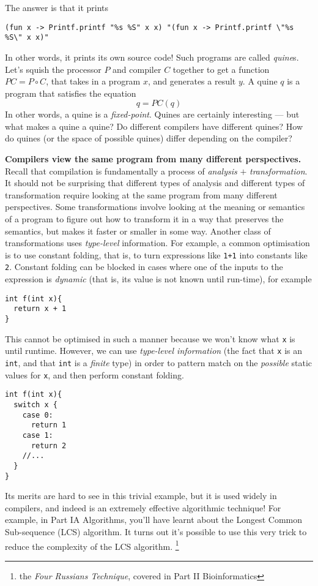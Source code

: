 The answer is that it prints 

{
\verb|(fun x -> Printf.printf "%s %S" x x) "(fun x -> Printf.printf \"%s %S\" x x)"|
}

In other words, it prints its own source code! Such programs are called \emph{quine}s. Let's squish the processor $P$ and compiler $C$ together to get a function $PC = P \circ C$, that takes in a program $x$, and generates a result $y$. A quine $q$ is a program that satisfies the equation
\[q = PC(q)\]
In other words, a quine is a \emph{fixed-point}. Quines are certainly interesting --- but what makes a quine a quine? Do different compilers have different quines? How do quines (or the space of possible quines) differ depending on the compiler?

\textbf{Compilers view the same program from many different perspectives.} Recall that compilation is fundamentally a process of \textit{analysis} $+$ \textit{transformation}. It should not be surprising that different types of analysis and different types of transformation require looking at the same program from many different perspectives. Some transformations involve looking at the meaning or semantics of a program to figure out how to transform it in a way that preserves the semantics, but makes it faster or smaller in some way. Another class of transformations uses \emph{type-level} information. For example, a common optimisation is to use constant folding, that is, to turn expressions like \texttt{1+1} into constants like \texttt{2}. Constant folding can be blocked in cases where one of the inputs to the expression is \emph{dynamic} (that is, its value is not known until run-time), for example

\begin{verbatim}
int f(int x){
  return x + 1
}
\end{verbatim}
This cannot be optimised in such a manner because we won't know what \texttt{x} is until runtime. However, we can use \emph{type-level information} (the fact that \texttt{x} is an \texttt{int}, and that \texttt{int} is a \emph{finite} type) in order to pattern match on the \emph{possible} static values for \texttt{x}, and then perform constant folding. 

\begin{verbatim}
int f(int x){
  switch x {
    case 0:
      return 1
    case 1:
      return 2
    //...
  }
}
\end{verbatim}
Its merits are hard to see in this trivial example, but it is used widely in compilers, and indeed is an extremely effective algorithmic technique! For example, in {\sffamily Part IA Algorithms}, you'll have learnt about the Longest Common Sub-sequence (LCS) algorithm. It turns out it's possible to use this very trick to reduce the complexity of the LCS algorithm. \footnote{the \emph{Four Russians Technique}, covered in {\sffamily Part II Bioinformatics}}


